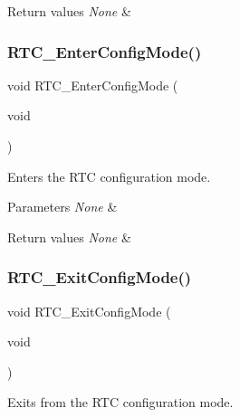 \begin{DoxyRetVals}{Return values}
{\em None} & \\
\hline
\end{DoxyRetVals}
\mbox{\label{group___r_t_c___private___functions_ga23612d9da2fe057a0cd72c684e5b438a}} 
\subsubsection{\texorpdfstring{RTC\_EnterConfigMode()}{RTC\_EnterConfigMode()}}
{\footnotesize\ttfamily void R\+T\+C\+\_\+\+Enter\+Config\+Mode (\begin{DoxyParamCaption}\item[{void}]{ }\end{DoxyParamCaption})}



Enters the R\+TC configuration mode. 


\begin{DoxyParams}{Parameters}
{\em None} & \\
\hline
\end{DoxyParams}

\begin{DoxyRetVals}{Return values}
{\em None} & \\
\hline
\end{DoxyRetVals}
\mbox{\label{group___r_t_c___private___functions_ga7585aa6e2dbb497173b2fd03bac0d304}} 
\subsubsection{\texorpdfstring{RTC\_ExitConfigMode()}{RTC\_ExitConfigMode()}}
{\footnotesize\ttfamily void R\+T\+C\+\_\+\+Exit\+Config\+Mode (\begin{DoxyParamCaption}\item[{void}]{ }\end{DoxyParamCaption})}



Exits from the R\+TC configuration mode. 


